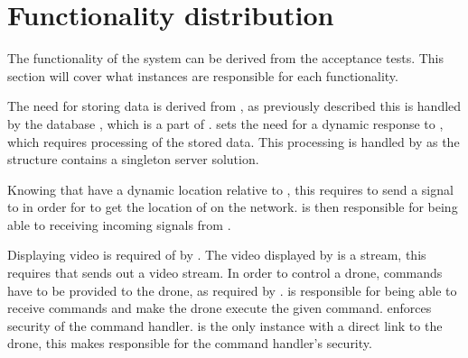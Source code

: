 \section{Functionality distribution}\label{sec:functionality_distrubution}

The functionality of the system can be derived from the acceptance tests.
This section will cover what instances are responsible for each functionality.

The need for storing data is derived from , as previously described this is handled by the database , which is a part of .
 sets the need for a dynamic response to , which requires processing of the stored data.
This processing is handled by  as the structure contains a singleton server solution.

Knowing that  have a dynamic location relative to , this requires  to send a signal to  in order for  to get the location of  on the network.
 is then responsible for being able to receiving incoming signals from .

Displaying video is required of  by .
The video displayed by  is a stream, this requires that  sends out a video stream.
In order to control a drone, commands have to be provided to the drone, as required by .
 is responsible for being able to receive commands and make the drone execute the given command.
 enforces security of the command handler.
 is the only instance with a direct link to the drone, this makes  responsible for the command handler's security.





